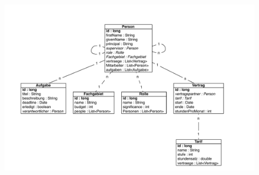 \documentclass[article,colorback,accentcolor=tud2c]{tudreport}
\begin{document}
\begin{figure}[h]
    \begin{center}
        \includegraphics[scale=0.65]{img/db}
    \end{center}
\end{figure}

\end{document}
